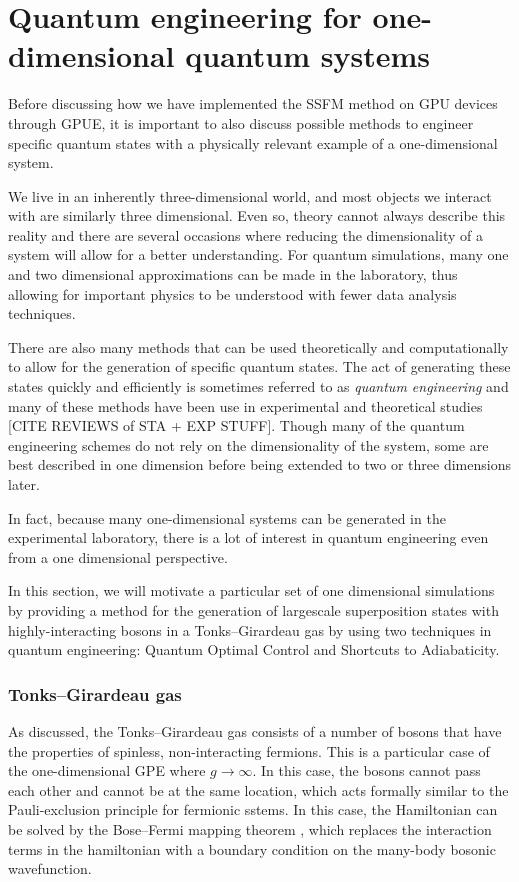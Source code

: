\chapter{Quantum engineering for one-dimensional quantum systems}
\label{ch:1d}

Before discussing how we have implemented the SSFM method on GPU devices through GPUE, it is important to also discuss possible methods to engineer specific quantum states with a physically relevant example of a one-dimensional system.

We live in an inherently three-dimensional world, and most objects we interact with are similarly three dimensional.
Even so, theory cannot always describe this reality and there are several occasions where reducing the dimensionality of a system will allow for a better understanding.
For quantum simulations, many one and two dimensional approximations can be made in the laboratory, thus allowing for important physics to be understood with fewer data analysis techniques.

There are also many methods that can be used theoretically and computationally to allow for the generation of specific quantum states.
The act of generating these states quickly and efficiently is sometimes referred to as \textit{quantum engineering} and many of these methods have been use in experimental and theoretical studies [CITE REVIEWS of STA + EXP STUFF].
Though many of the quantum engineering schemes do not rely on the dimensionality of the system, some are best described in one dimension before being extended to two or three dimensions later.

In fact, because many one-dimensional systems can be generated in the experimental laboratory, there is a lot of interest in quantum engineering even from a one dimensional perspective.

In this section, we will motivate a particular set of one dimensional simulations by providing a method for the generation of largescale superposition states with highly-interacting bosons in a Tonks--Girardeau gas by using two techniques in quantum engineering: Quantum Optimal Control and Shortcuts to Adiabaticity.

\subsection{Tonks--Girardeau gas}

As discussed, the Tonks--Girardeau gas consists of a number of bosons that have the properties of spinless, non-interacting fermions.
This is a particular case of the one-dimensional GPE where $g\rightarrow\infty$.
In this case, the bosons cannot pass each other and cannot be at the same location, which acts formally similar to the Pauli-exclusion principle for fermionic sstems.
In this case, the Hamiltonian can be solved by the Bose--Fermi mapping theorem \cite{girardeau2001ground, girardeau2001measurement}, which replaces the interaction terms in the hamiltonian with a boundary condition on the many-body bosonic wavefunction.


